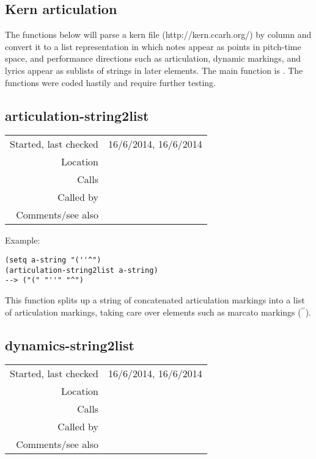 \subsection{Kern articulation}\label{sec:kern-articulation}

The functions below will parse a kern file
(http://kern.ccarh.org/) by column and convert it to a
list representation in which notes appear as points
in pitch-time space, and performance directions such
as articulation, dynamic markings, and lyrics appear
as sublists of strings in later elements. The main
function is
.
The functions were coded hastily and require further
testing.


\subsection*{articulation-string2list}\label{fun:articulation-string2list}

\vspace{0.3cm}
\begin{tabular}{r|p{8cm}}
Started, last checked & 16/6/2014, 16/6/2014 \\
Location & \nameref{sec:kern-articulation} \\
Calls & \\
Called by & \nameref{fun:parse-kern-notes-artic-dynam-lyrics} \\
Comments/see also &
\end{tabular}

\vspace{0.5cm}
\noindent Example:
\begin{verbatim}
(setq a-string "(''^")
(articulation-string2list a-string)
--> ("(" "''" "^")
\end{verbatim}

\noindent This function splits up a string of
concatenated articulation markings into a list of
articulation markings, taking care over elements such as
marcato markings ($^{\prime\prime}$).


\subsection*{dynamics-string2list}\label{fun:dynamics-string2list}

\vspace{0.3cm}
\begin{tabular}{r|p{8cm}}
Started, last checked & 16/6/2014, 16/6/2014 \\
Location & \nameref{sec:kern-articulation} \\
Calls & \\
Called by & \nameref{fun:parse-kern-notes-artic-dynam-lyrics} \\
Comments/see also &
\end{tabular}

